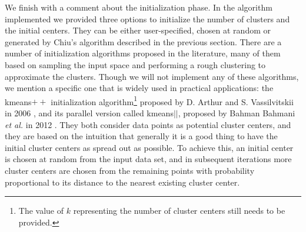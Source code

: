 We finish with a comment about the initialization phase. In the algorithm implemented we provided three options to initialize the number of clusters and the initial centers. They can be either user-specified, chosen at random or generated by Chiu's algorithm described in the previous section. There are a number of initialization algorithms proposed in the literature, many of them based on sampling the input space and performing a rough clustering to approximate the clusters. Though we will not implement any of these algorithms, we mention a specific one that is widely used in practical applications: the kmeans$++$ initialization algorithm\footnote{The value of $k$ representing the number of cluster centers still needs to be provided.} proposed by D. Arthur and S. Vassilvitskii in 2006 \cite{arthur2006k}, and its parallel version called kmeans$||$, proposed by Bahman Bahmani \textit{et al.} in 2012 \cite{bahmani2012scalable}. They both consider data points as potential cluster centers, and they are based on the intuition that generally it is a good thing to have the initial cluster centers as spread out as possible. To achieve this, an initial center is chosen at random from the input data set, and in subsequent iterations more cluster centers are chosen from the remaining points with probability proportional to its distance to the nearest existing cluster center.
